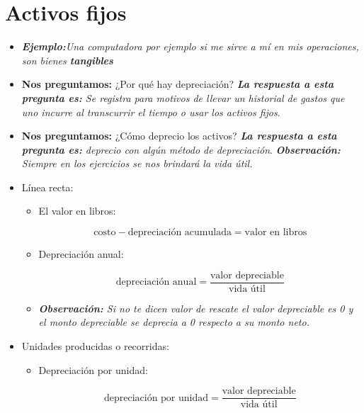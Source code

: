 \section{Activos fijos}
\begin{itemize}
    \item \emph{\textbf{Ejemplo:}Una computadora por ejemplo si me sirve a mí en mis operaciones, son bienes \textbf{tangibles}}
    \item \textbf{Nos preguntamos:} ¿Por qué hay depreciación? \emph{\textbf{La respuesta a esta pregunta es: }Se registra para motivos de llevar un historial de gastos que uno incurre al transcurrir el tiempo o usar los activos fijos}.
    \item \textbf{Nos preguntamos:} ¿Cómo deprecio los activos? \emph{\textbf{La respuesta a esta pregunta es: }deprecio con algún método de depreciación}. \emph{\textbf{Observación: }Siempre en los ejercicios se nos brindará la vida útil.}
    \item Línea recta:
        \begin{itemize}
            \item El valor en libros:
                \begin{center}
                   \[
                     \text{costo} - \text{depreciación acumulada} = \text{valor en libros}
                   \]
                \end{center}
            
            \item Depreciación anual: 
                \begin{center}
                \[
                    \text{depreciación anual} = \frac{\text{valor depreciable}}{\text{vida útil}}
                \]
                \end{center}
            
            \item \emph{\textbf{Observación: }Si no te dicen valor de rescate el valor depreciable es 0 y el monto depreciable se deprecia a 0 respecto a su monto neto.}
        \end{itemize}

    
    \item Unidades producidas o recorridas:
        \begin{itemize}
            \item Depreciación por unidad:
                \begin{center}
                    \[
                        \text{depreciación por unidad} = \frac{\text{valor depreciable}}{\text{vida útil}}
                    \]
                \end{center}
        \end{itemize}
            

\end{itemize}
